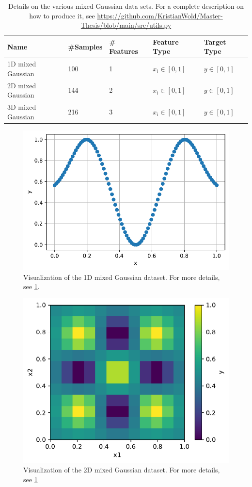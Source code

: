 \begin{table}[H]
\begin{tabular}{|l|l|l|l|l|}
\hline
 Name& \#Samples&  \# Features& Feature Type& Target Type \\ \hline
 1D mixed Gaussian&  100&  1& $x_i \in [0,1]$ & $y \in [0,1]$  \\ \hline
 2D mixed Gaussian&  144&  2& $x_i \in [0,1]$ & $y \in [0,1]$ \\ \hline
 3D mixed Gaussian&  216&  3& $x_i \in [0,1]$ & $y \in [0,1]$ \\ \hline
\end{tabular}
\caption{Details on the various mixed Gaussian data sets. For a complete description on how to produce it, see \url{https://github.com/KristianWold/Master-Thesis/blob/main/src/utils.py}}
\label{tab:MixedGaussianData}
\end{table}

\begin{figure}[H]
    \centering
    \includegraphics[width=12cm]{latex/figures/gaussian_1D.pdf}
    \caption{Visualization of the 1D mixed Gaussian dataset. For more details, see \cref{tab:MixedGaussianData}.} 
    \label{fig:mixed Gaussian 1D}
\end{figure}

\begin{figure}[H]
    \centering
    \includegraphics[width=12cm]{latex/figures/gaussian_2D.pdf}
    \caption{Visualization of the 2D mixed Gaussian dataset. For more details, see \cref{tab:MixedGaussianData}} 
    \label{fig:mixed Gaussian 2D}
\end{figure}

